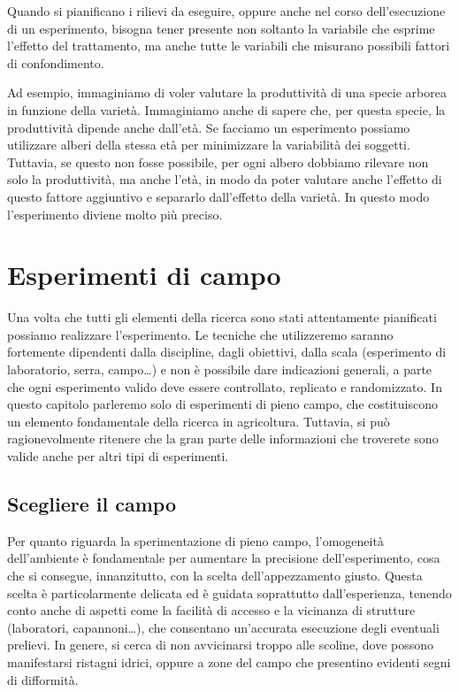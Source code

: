 \documentclass[a4paper,12pt,oneside]{book}
\begin{document}
Quando si pianificano i rilievi da eseguire, oppure anche nel corso dell'esecuzione di un esperimento, bisogna tener presente non soltanto la variabile che esprime l'effetto del trattamento, ma anche tutte le variabili che misurano possibili fattori di confondimento.

Ad esempio, immaginiamo di voler valutare la produttività di una specie arborea in funzione della varietà. Immaginiamo anche di sapere che, per questa specie, la produttività dipende anche dall'età. Se facciamo un esperimento possiamo utilizzare alberi della stessa età per minimizzare la variabilità dei soggetti. Tuttavia, se questo non fosse possibile, per ogni albero dobbiamo rilevare non solo la produttività, ma anche l'età, in modo da poter valutare anche l'effetto di questo fattore aggiuntivo e separarlo dall'effetto della varietà. In questo modo l'esperimento diviene molto più preciso.

\hypertarget{esperimenti-di-campo}{%
\section{Esperimenti di campo}\label{esperimenti-di-campo}}

Una volta che tutti gli elementi della ricerca sono stati attentamente pianificati possiamo realizzare l'esperimento. Le tecniche che utilizzeremo saranno fortemente dipendenti dalla discipline, dagli obiettivi, dalla scala (esperimento di laboratorio, serra, campo\ldots) e non è possibile dare indicazioni generali, a parte che ogni esperimento valido deve essere controllato, replicato e randomizzato.
In questo capitolo parleremo solo di esperimenti di pieno campo, che costituiscono un elemento fondamentale della ricerca in agricoltura. Tuttavia, si può ragionevolmente ritenere che la gran parte delle informazioni che troverete sono valide anche per altri tipi di esperimenti.

\hypertarget{scegliere-il-campo}{%
\subsection{Scegliere il campo}\label{scegliere-il-campo}}

Per quanto riguarda la sperimentazione di pieno campo, l'omogeneità dell'ambiente è fondamentale per aumentare la precisione dell'esperimento, cosa che si consegue, innanzitutto, con la scelta dell'appezzamento giusto. Questa scelta è particolarmente delicata ed è guidata soprattutto dall'esperienza, tenendo conto anche di aspetti come la facilità di accesso e la vicinanza di strutture (laboratori, capannoni\ldots), che consentano un'accurata esecuzione degli eventuali prelievi. In genere, si cerca di non avvicinarsi troppo alle scoline, dove possono manifestarsi ristagni idrici, oppure a zone del campo che presentino evidenti segni di difformità.
\end{document}
